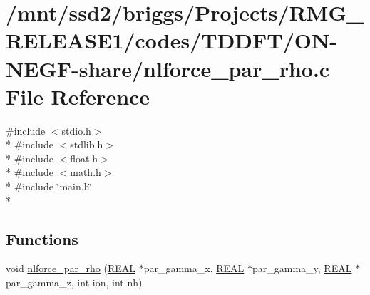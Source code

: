 \hypertarget{_t_d_d_f_t_2_o_n-_n_e_g_f-share_2nlforce__par__rho_8c}{\section{/mnt/ssd2/briggs/\-Projects/\-R\-M\-G\-\_\-\-R\-E\-L\-E\-A\-S\-E1/codes/\-T\-D\-D\-F\-T/\-O\-N-\/\-N\-E\-G\-F-\/share/nlforce\-\_\-par\-\_\-rho.c File Reference}
\label{_t_d_d_f_t_2_o_n-_n_e_g_f-share_2nlforce__par__rho_8c}
}
{\ttfamily \#include $<$stdio.\-h$>$}\\*
{\ttfamily \#include $<$stdlib.\-h$>$}\\*
{\ttfamily \#include $<$float.\-h$>$}\\*
{\ttfamily \#include $<$math.\-h$>$}\\*
{\ttfamily \#include \char`\"{}main.\-h\char`\"{}}\\*
\subsection*{Functions}
\begin{DoxyCompactItemize}
\item 
void \hyperlink{_t_d_d_f_t_2_o_n-_n_e_g_f-share_2nlforce__par__rho_8c_aa749053bac2fc20e6280f98332c88b03}{nlforce\-\_\-par\-\_\-rho} (\hyperlink{md_8h_a4b654506f18b8bfd61ad2a29a7e38c25}{R\-E\-A\-L} $\ast$par\-\_\-gamma\-\_\-x, \hyperlink{md_8h_a4b654506f18b8bfd61ad2a29a7e38c25}{R\-E\-A\-L} $\ast$par\-\_\-gamma\-\_\-y, \hyperlink{md_8h_a4b654506f18b8bfd61ad2a29a7e38c25}{R\-E\-A\-L} $\ast$par\-\_\-gamma\-\_\-z, int ion, int nh)
\end{DoxyCompactItemize}


